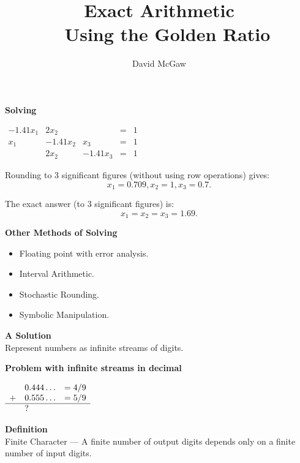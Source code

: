 \documentclass{csslides}\raggedright
\begin{document}
\title{Exact Arithmetic \\~ Using the Golden Ratio \\ [5ex]}
\author{David McGaw}
\date[CS]{}
\maketitle

\begin{slide}{}
\vfill

{\bf Solving}

\begin{center}
\begin{math}
\begin{array}{ccccc}
-1.41x_{1} & 2x_{2} & & = & 1 \\
x_{1} & -1.41x_{2} & x_{3} & = & 1 \\
 & 2x_{2} & -1.41x_{3}  & = & 1
\end{array}
\end{math}
\end{center}

\vfill

Rounding to 3 significant figures (without using row operations) gives:
\[ x_{1}=0.709, x_{2}=1, x_{3}=0.7.\]

The exact answer (to 3 significant figures) is: \[ x_{1}=x_{2}=x_{3}=1.69. \]

\vfill
\end{slide}


\begin{slide}{}

\vfill
{\bf Other Methods of Solving}
\begin{itemize}
\item Floating point with error analysis.
\item Interval Arithmetic.
\item Stochastic Rounding.
\item Symbolic Manipulation.
\end{itemize}
\vfill
\end{slide}


\begin{slide}{}
{\bf A Solution} \\
Represent numbers as infinite streams of digits.

\vfill

{\bf Problem with infinite streams in decimal}

\begin{center}
\begin{math}
\begin{array}{rll}
& 0.444\ldots & = 4/9 \\
+ & 0.555 \ldots & = 5/9 \\ \hline
& ?
\end{array}
\end{math}
\end{center}

\vfill

{\bf Definition} \\
Finite Character --- A finite number of output digits depends only on a finite number of input digits.
\vfill
\end{slide}
\end{document}
